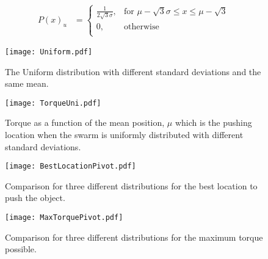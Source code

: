 \begin{align}
P(x)_{u} &=  \left\{
\begin{array}{ll}
    \frac{1}{2\sqrt{3}\sigma}, &  \textrm{for   } \mu-\sqrt{3}\sigma \leq x \leq \mu-\sqrt{3}\\
     0, & \textrm{otherwise}\\
\end{array} 
\right.
\end{align}

\begin{figure}
\begin{center}
	\texttt{[image: Uniform.pdf]}
\end{center}
\vspace{-1em}
\caption{\label{fig:pdfUni}
The Uniform distribution with different standard deviations and the same mean.
}
\vspace{-1em}
\end{figure}

\begin{figure}
\begin{center}
	\texttt{[image: TorqueUni.pdf]}
\end{center}
\vspace{-1em}
\caption{\label{fig:torqueUni}
Torque as a function of the mean position, $\mu$ which is the pushing location when the swarm is uniformly distributed with different standard deviations.
}
\vspace{-1em}
\end{figure}

\begin{figure}
\begin{center}
	\texttt{[image: BestLocationPivot.pdf]}
\end{center}
\vspace{-1em}
\caption{\label{fig:besLocPiv}
Comparison for three different distributions for the best location to push the object.
}
\vspace{-1em}
\end{figure}

\begin{figure}
\begin{center}
	\texttt{[image: MaxTorquePivot.pdf]}
\end{center}
\vspace{-1em}
\caption{\label{fig:maxTorPiv}
Comparison for three different distributions for the maximum torque possible.
}
\vspace{-1em}
\end{figure}
